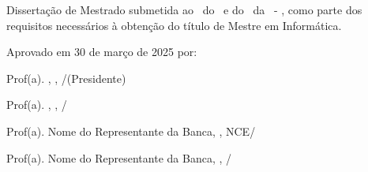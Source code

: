 \thispagestyle{empty}
\makeatletter
\begin{spacing}{1}
\begin{center}

\large \textbf{\@title}

\vspace{1.5cm}
\large \@author

\end{center}

\vspace{0.5cm}

\begin{quoting}[leftmargin=7.0cm, rightmargin=1cm]
Dissertação de Mestrado submetida ao \@programa\ do \@instcomp\ e do \@instncecurto\ da \@faculdade\ - \@faculdadesigla, como parte dos requisitos necessários à obtenção do título de Mestre em Informática.
\end{quoting}

\vspace{1.5cm}
Aprovado em 30 de março de 2025 por:

\vspace{2cm}
\begin{flushright}

\hspace{5cm} \hrulefill

Prof(a). \@orientadora, \@orientadorastitulo, \@progsigla/\@faculdadesigla (Presidente)

\vspace{2cm}
\hspace{5cm} \hrulefill

Prof(a). \@coorientadora, \@orientadorastitulo, \@progsigla/\@faculdadesigla

\vspace{2cm}
\hspace{5cm} \hrulefill

Prof(a). Nome do Representante da Banca, \@orientadorastitulo, NCE/\@faculdadesigla


\vspace{2cm}
\hspace{5cm} \hrulefill

Prof(a). Nome do Representante da Banca, \@orientadorastitulo, \@progsigla/\@faculdadesigla

\end{flushright}

\end{spacing}
\makeatother
\newpage